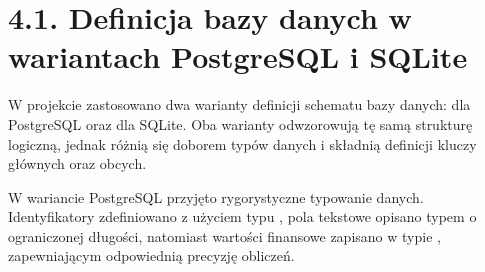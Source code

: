 \documentclass[letterpaper,10pt,polish]{sphinxmanual}
\begin{document}
\section{4.1. Definicja bazy danych w wariantach PostgreSQL i SQLite}
\label{\detokenize{rozdzial_4/index:definicja-bazy-danych-w-wariantach-postgresql-i-sqlite}}
\sphinxAtStartPar
W projekcie zastosowano dwa warianty definicji schematu bazy danych: dla PostgreSQL oraz dla SQLite. Oba warianty odwzorowują tę samą strukturę logiczną, jednak różnią się doborem typów danych i składnią definicji kluczy głównych oraz obcych.

\sphinxAtStartPar
W wariancie PostgreSQL przyjęto rygorystyczne typowanie danych. Identyfikatory zdefiniowano z użyciem typu , pola tekstowe opisano typem  o ograniczonej długości, natomiast wartości finansowe zapisano w typie , zapewniającym odpowiednią precyzję obliczeń.
\end{document}
